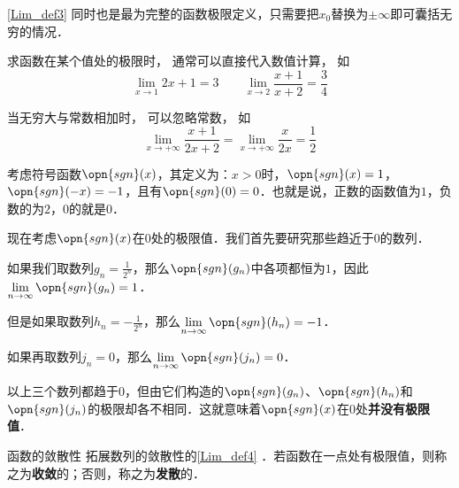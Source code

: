 \autoref{Lim_def3} 同时也是最为完整的函数极限定义，只需要把$x_0$替换为$\pm\infty$即可囊括无穷的情况．



\begin{example}{}
求函数在某个值处的极限时， 通常可以直接代入数值计算， 如
\begin{equation}
\lim_{x\to 1} 2x + 1 = 3 \qquad \lim_{x\to 2}\frac{x + 1}{x + 2} = \frac34
\end{equation}

当无穷大与常数相加时， 可以忽略常数， 如
\begin{equation}
\lim_{x\to +\infty} \frac{x + 1}{2x + 2} = \lim_{x\to +\infty} \frac{x}{2x} = \frac12
\end{equation}
\end{example}

\begin{example}{}\label{Lim_ex2}
考虑符号函数$\opn{sgn}(x)$，其定义为：$x>0$时，$\opn{sgn}(x)=1$，$\opn{sgn}(-x)=-1$，且有$\opn{sgn}(0)=0$．也就是说，正数的函数值为$1$，负数的为$2$，$0$的就是$0$．

现在考虑$\opn{sgn}(x)$在$0$处的极限值．我们首先要研究那些趋近于$0$的数列．

如果我们取数列$g_n=\frac{1}{2^n}$，那么$\opn{sgn}(g_n)$中各项都恒为$1$，因此$\lim\limits_{n\to\infty}\opn{sgn}(g_n)=1$．

但是如果取数列$h_n=-\frac{1}{2^n}$，那么$\lim\limits_{n\to\infty}\opn{sgn}(h_n)=-1$．

如果再取数列$j_n=0$，那么$\lim\limits_{n\to\infty}\opn{sgn}(j_n)=0$．

以上三个数列都趋于$0$，但由它们构造的$\opn{sgn}(g_n)$、$\opn{sgn}(h_n)$和$\opn{sgn}(j_n)$的极限却各不相同．这就意味着$\opn{sgn}(x)$在$0$处\textbf{并没有极限值}．
\end{example}

\begin{definition}{函数的敛散性}
拓展数列的敛散性的\autoref{Lim_def4} ．若函数在一点处有极限值，则称之为\textbf{收敛}的；否则，称之为\textbf{发散}的．
\end{definition}

